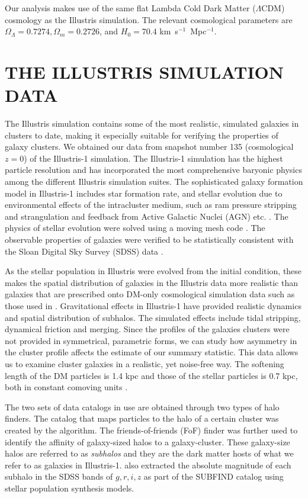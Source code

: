 	Our analysis makes use of the same flat Lambda Cold Dark Matter ($\Lambda$CDM) cosmology
as the Illustris simulation. The relevant cosmological parameters are
$\Omega_\Lambda = 0.7274, \Omega_m = 0.2726$, and $H_0 = 70.4$
km~s$^{-1}$~Mpc$^{-1}$.

\section{THE ILLUSTRIS SIMULATION DATA} 
\label{sec:illustris_sim}
The Illustris simulation contains some of the most
realistic, simulated galaxies in clusters to date, making it especially suitable for 
verifying the properties of galaxy clusters. We obtained our data from 
snapshot number 135 (cosmological $z=0$) of the Illustris-1 simulation. The Illustris-1
simulation has the highest particle resolution and has incorporated the most 
comprehensive baryonic physics among the different Illustris simulation suites. 
The sophisticated galaxy formation model in Illustris-1 
includes star formation rate, and stellar evolution due to
environmental effects of the intracluster medium, such as ram pressure stripping and
strangulation and feedback from Active Galactic Nuclei (AGN) etc. \citep{Genel2014a}.
The physics of stellar
evolution were solved using a moving mesh code {} \citep{Springel2010}.
The observable properties of galaxies were verified to be statistically consistent
with the Sloan Digital Sky Survey (SDSS) data
\citep{Vogelsberger2014}. 

As the stellar population in Illustris were evolved from the initial condition,
these makes the spatial distribution of galaxies in the Illustris data more 
realistic than galaxies that are prescribed onto DM-only cosmological
simulation data such as those used in \cite{Harvey2013d}.  
Gravitational effects in Illustris-1 have provided realistic dynamics and
spatial distribution of subhalos. The simulated effects include
tidal stripping, dynamical friction and merging. 
Since the profiles of the galaxies clusters were not
provided in symmetrical, parametric forms, we can study 
how asymmetry in the cluster profile affects the estimate of our summary 
statistic. This data allows us to examine cluster galaxies
in a realistic, yet noise-free way. The softening length of the DM particles is
1.4 kpc and those of the stellar particles is 
0.7 kpc, both in constant comoving units \citep{Genel2014a}.

The two sets of data catalogs in use are obtained through two types of halo
finders. The catalog that maps particles to the halo of a certain cluster was 
created by the {} algorithm. The friends-of-friends (FoF) 
finder \citep{Davis1985} was further used to identify the affinity
of galaxy-sized halos to a galaxy-cluster. 
These galaxy-size halos are referred to as {\it subhalos} and 
they are the dark matter hosts of what we refer to as galaxies in Illustris-1. 
\cite{Vogelsberger2014a} also extracted the 
absolute magnitude of each subhalo in
the SDSS bands of $g, r, i, z$ as part of the {\sc
SUBFIND} catalog using stellar population synthesis models.

